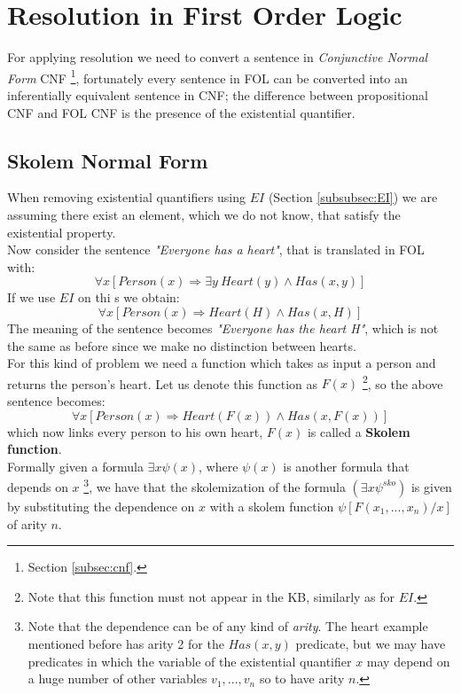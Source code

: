 \documentclass[10pt,a4paper]{article}
\begin{document}
\newpage
\section{Resolution in First Order Logic}
For applying resolution we need to convert a sentence in \textit{Conjunctive Normal Form} CNF \footnote{Section \ref{subsec:cnf}.}, fortunately every sentence in FOL can be converted into an inferentially equivalent sentence in CNF; the difference between propositional CNF and FOL CNF is the presence of the existential quantifier.


\subsection{Skolem Normal Form}
\label{sec:skolemNF}
When removing existential quantifiers using $EI$ (Section \ref{subsubsec:EI}) we are assuming there exist an element, which we do not know, that satisfy the existential property.\\
Now consider the sentence \textit{"Everyone has a heart"}, that is translated in FOL with:
\[\forall x [Person(x)\Rightarrow \exists y\ Heart(y)\wedge Has(x,y)]\]
If we use $EI$ on thi s we obtain:
\[\forall x [Person(x)\Rightarrow  Heart(H)\wedge Has(x,H)]\]
The meaning of the sentence becomes \textit{"Everyone has the heart H"}, which is not the same as before since we make no distinction between hearts.\\
For this kind of problem we need a function which takes as input a person and returns the person's heart. Let us denote this function as $F(x)$ \footnote{Note that this function must not appear in the KB, similarly as for $EI$.}, so the above sentence becomes:
\[\forall x [Person(x)\Rightarrow  Heart(F(x))\wedge Has(x,F(x))]\]
which now links every person to his own heart, $F(x)$ is called a \textbf{Skolem function}.\\
Formally given a formula $\exists x\psi(x)$, where $\psi(x)$ is another formula that depends on $x$ \footnote{Note that the dependence can be of any kind of \textit{arity}. The heart example mentioned before has arity 2 for the $Has(x,y)$ predicate, but we may have predicates in which the variable of the existential quantifier $x$ may depend on a huge number of other variables $v_1,...,v_n$ so to have arity $n$.}, we have that the skolemization of the formula $(\exists x\psi^{sko})$ is given by substituting the dependence on $x$ with a skolem function $\psi[F(x_1,...,x_n)/x]$ of arity $n$.
\end{document}
